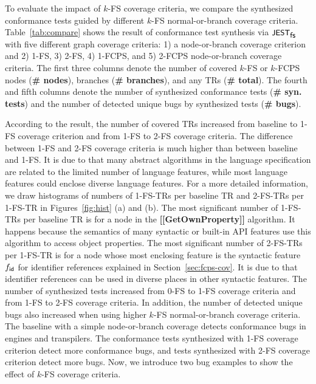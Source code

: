 
To evaluate the impact of $k$-FS coverage criteria, we compare the synthesized
conformance tests guided by different $k$-FS normal-or-branch coverage criteria.
%
Table~\ref{tab:compare} shows the result of conformance test synthesis via
$\textsf{\small JEST}_{\textsf{\small fs}}$ with five different graph coverage criteria: 1) a node-or-branch
coverage criterion and 2) 1-FS, 3) 2-FS, 4) 1-FCPS, and 5) 2-FCPS node-or-branch
coverage criteria.
%
The first three columns denote the number of covered $k$-FS or $k$-FCPS nodes
(\textbf{\# nodes}), branches (\textbf{\# branches}), and any TRs (\textbf{\#
total}).
%
The fourth and fifth columns denote the number of synthesized conformance tests
(\textbf{\# syn. tests}) and the number of detected unique bugs by synthesized
tests (\textbf{\# bugs}).


According to the result, the number of covered TRs increased  from baseline to 1-FS coverage criterion and  from 1-FS to 2-FS coverage criteria.
%
The difference between 1-FS and 2-FS coverage criteria is much higher than
between baseline and 1-FS.
%
It is due to that many abstract algorithms in the language specification are
related to the limited number of language features, while most language features
could enclose diverse language features.
%
For a more detailed information, we draw histograms of numbers of 1-FS-TRs per
baseline TR and 2-FS-TRs per 1-FS-TR in Figures~\ref{fig:hist} (a) and (b).
%
The most significant number of 1-FS-TRs per baseline TR is  for a
node in the \textbf{[[GetOwnProperty]]} algorithm.
%
It happens because the semantics of many syntactic or built-in API features use
this algorithm to access object properties.
%
The most significant number of 2-FS-TRs per 1-FS-TR is  for a node
whose most enclosing feature is the syntactic feature $f_{\textsf{id}}$ for identifier
references explained in Section~\ref{sec:fcps-cov}.
%
It is due to that identifier references can be used in diverse places in other
syntactic features.
%
The number of synthesized tests increased  from
0-FS to 1-FS coverage criteria and  from 1-FS to
2-FS coverage criteria.
%
In addition, the number of detected unique bugs also increased when using higher
$k$-FS normal-or-branch coverage criteria.
%
The baseline with a simple node-or-branch coverage detects 
conformance bugs in engines and transpilers.
%
The conformance tests synthesized with 1-FS coverage criterion detect  more conformance bugs, and tests synthesized with 2-FS coverage
criterion detect  more bugs.
%
Now, we introduce two bug examples to show the effect of $k$-FS coverage
criteria.

